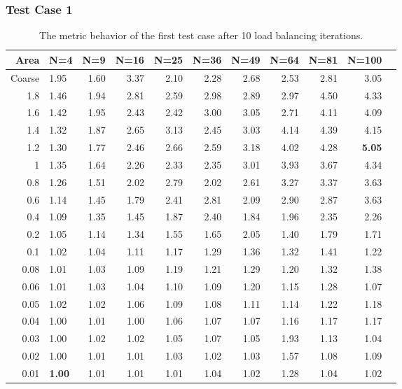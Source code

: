 \documentclass[]{beamer}
\begin{document}
\begin{frame}[t]\frametitle{Test Case 1}
\begin{table}[H]
\tiny
\centering
\caption{The metric behavior of the first test case after 10 load balancing iterations.} 
\begin{tabular}{rlrrrrrrrrr}
  \hline
 Area & N=4 & N=9 & N=16 & N=25 & N=36 & N=49 & N=64 & N=81 & N=100 \\ 
  \hline
 Coarse & 1.95 & 1.60 & 3.37 & 2.10 & 2.28 & 2.68 & 2.53 & 2.81 & 3.05 \\ 
 1.8 & 1.46 & 1.94 & 2.81 & 2.59 & 2.98 & 2.89 & 2.97 & 4.50 & 4.33 \\ 
 1.6 & 1.42 & 1.95 & 2.43 & 2.42 & 3.00 & 3.05 & 2.71 & 4.11 & 4.09 \\ 
1.4 & 1.32 & 1.87 & 2.65 & 3.13 & 2.45 & 3.03 & 4.14 & 4.39 & 4.15 \\ 
 1.2 & 1.30 & 1.77 & 2.46 & 2.66 & 2.59 & 3.18 & 4.02 & 4.28 & \textbf{\cellcolor{blue!25}5.05} \\ 
  1 & 1.35 & 1.64 & 2.26 & 2.33 & 2.35 & 3.01 & 3.93 & 3.67 & 4.34 \\ 
 0.8 & 1.26 & 1.51 & 2.02 & 2.79 & 2.02 & 2.61 & 3.27 & 3.37 & 3.63 \\ 
 0.6 & 1.14 & 1.45 & 1.79 & 2.41 & 2.81 & 2.09 & 2.90 & 2.87 & 3.63 \\ 
   0.4 & 1.09 & 1.35 & 1.45 & 1.87 & 2.40 & 1.84 & 1.96 & 2.35 & 2.26 \\ 
   0.2 & 1.05 & 1.14 & 1.34 & 1.55 & 1.65 & 2.05 & 1.40 & 1.79 & 1.71 \\ 
  0.1 & 1.02 & 1.04 & 1.11 & 1.17 & 1.29 & 1.36 & 1.32 & 1.41 & 1.22 \\ 
  0.08 & 1.01 & 1.03 & 1.09 & 1.19 & 1.21 & 1.29 & 1.20 & 1.32 & 1.38 \\ 
   0.06 & 1.01 & 1.03 & 1.04 & 1.10 & 1.09 & 1.20 & 1.15 & 1.28 & 1.07 \\ 
   0.05 & 1.02 & 1.02 & 1.06 & 1.09 & 1.08 & 1.11 & 1.14 & 1.22 & 1.18 \\ 
   0.04 & 1.00 & 1.01 & 1.00 & 1.06 & 1.07 & 1.07 & 1.16 & 1.17 & 1.17 \\ 
   0.03 & 1.00 & 1.02 & 1.02 & 1.05 & 1.07 & 1.05 & 1.93 & 1.13 & 1.04 \\ 
   0.02 & 1.00 & 1.01 & 1.01 & 1.03 & 1.02 & 1.03 & 1.57 & 1.08 & 1.09 \\ 
   0.01 & \textbf{\cellcolor{blue!25}1.00} & 1.01 & 1.01 & 1.01 & 1.04 & 1.02 & 1.28 & 1.04 & 1.02 \\ 
   \hline
\end{tabular}
\end{table}
\end{frame}
\end{document}
